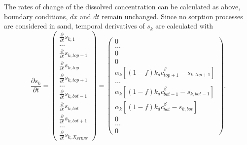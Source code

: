 The rates of change of the dissolved concentration can be calculated as above, boundary conditions, $dx$ and $dt$ remain unchanged. Since no sorption processes are considered in sand, temporal derivatives of $s_k$ are calculated with
\begin{equation}
    \frac{\partial s_k}{\partial t} = \left(\begin{matrix} \frac{\partial}{\partial t} s_{k,1}\\ ...\\\frac{\partial}{\partial t} s_{k, top-1}\\\frac{\partial}{\partial t} s_{k, top}\\\frac{\partial}{\partial t} s_{k, top+1}\\...\\\frac{\partial}{\partial t} s_{k, bot-1}\\\frac{\partial}{\partial t} s_{k, bot}\\\frac{\partial}{\partial t} s_{k, bot+1}\\
    ...\\ \frac{\partial}{\partial t} s_{k, X_{STEPS}} \end{matrix}\right) = \left(\begin{matrix} 0\\ ...\\0\\0\\\alpha_k \left[(1-f)k_dc_{top+1}^{\beta} - s_{k, top+1}\right]\\...\\\alpha_k \left[(1-f)k_dc_{bot-1}^{\beta} - s_{k, bot-1}\right]\\\alpha_k
    \left[(1-f)k_dc_{bot}^{\beta} - s_{k, bot}\right]\\0\\
    ...\\ 0 \end{matrix}\right).
\end{equation}
